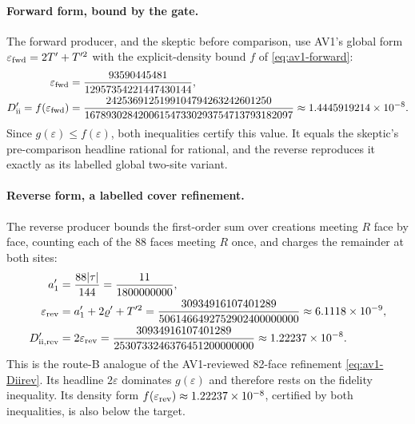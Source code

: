 \paragraph{Forward form, bound by the gate.}
The forward producer, and the skeptic before comparison, use AV1's global
form $\varepsilon_{\rm fwd}=2T'+T'^2$ with the explicit-density bound $f$ of
\eqref{eq:av1-forward}:
\begin{equation}
 \begin{aligned}
 \varepsilon_{\rm fwd}&=\frac{93590445481}{12957354221447430144},\\
 D'_{\rm ii}=f(\varepsilon_{\rm fwd})
 &=\frac{2425369125199104794263242601250}{167893028420061547330293754713793182097}
 \approx1.4445919214\times10^{-8}.
 \end{aligned}
 \label{eq:ax1-Dii}
\end{equation}
Since $g(\varepsilon)\le f(\varepsilon)$, both inequalities certify this
value. It equals the skeptic's pre-comparison headline rational for rational,
and the reverse reproduces it exactly as its labelled global two-site variant.

\paragraph{Reverse form, a labelled cover refinement.}
The reverse producer bounds the first-order sum over creations meeting $R$
face by face, counting each of the 88 faces meeting $R$ once, and charges the
remainder at both sites:
\begin{align}
 a_1'&=\frac{88|\tau|}{144}=\frac{11}{1800000000},\notag\\
 \varepsilon_{\rm rev}&=a_1'+2\varrho'+T'^2
 =\frac{30934916107401289}{5061466492752902400000000}\approx6.1118\times10^{-9},
 \label{eq:ax1-epsrev}\\
 D'_{\rm ii,rev}&=2\varepsilon_{\rm rev}
 =\frac{30934916107401289}{2530733246376451200000000}\approx1.22237\times10^{-8}.
 \label{eq:ax1-Diirev}
\end{align}
This is the route-B analogue of the AV1-reviewed 82-face refinement
\eqref{eq:av1-Diirev}. Its headline $2\varepsilon$ dominates $g(\varepsilon)$
and therefore rests on the fidelity inequality. Its density form
$f(\varepsilon_{\rm rev})\approx1.22237\times10^{-8}$, certified by both
inequalities, is also below the target.

